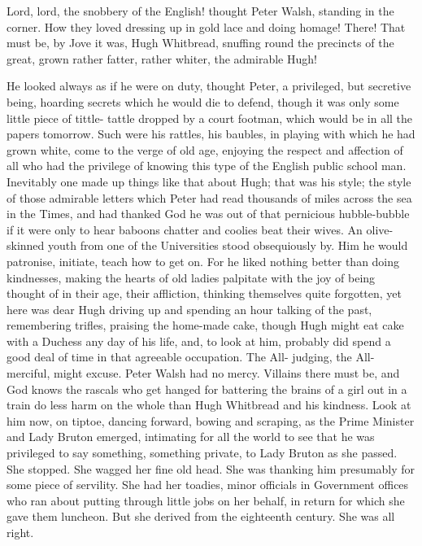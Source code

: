 \documentclass[lang=cn,10pt]{elegantbook}
\begin{document}
Lord, lord, the snobbery of the English! thought Peter Walsh,
standing in the corner.  How they loved dressing up in gold lace
and doing homage!  There!  That must be, by Jove it was, Hugh
Whitbread, snuffing round the precincts of the great, grown rather
fatter, rather whiter, the admirable Hugh!

He looked always as if he were on duty, thought Peter, a
privileged, but secretive being, hoarding secrets which he would
die to defend, though it was only some little piece of tittle-
tattle dropped by a court footman, which would be in all the papers
tomorrow.  Such were his rattles, his baubles, in playing with
which he had grown white, come to the verge of old age, enjoying
the respect and affection of all who had the privilege of knowing
this type of the English public school man.  Inevitably one made up
things like that about Hugh; that was his style; the style of those
admirable letters which Peter had read thousands of miles across
the sea in the Times, and had thanked God he was out of that
pernicious hubble-bubble if it were only to hear baboons chatter
and coolies beat their wives.  An olive-skinned youth from one of
the Universities stood obsequiously by.  Him he would patronise,
initiate, teach how to get on.  For he liked nothing better than
doing kindnesses, making the hearts of old ladies palpitate with
the joy of being thought of in their age, their affliction,
thinking themselves quite forgotten, yet here was dear Hugh driving
up and spending an hour talking of the past, remembering trifles,
praising the home-made cake, though Hugh might eat cake with a
Duchess any day of his life, and, to look at him, probably did
spend a good deal of time in that agreeable occupation.  The All-
judging, the All-merciful, might excuse.  Peter Walsh had no mercy.
Villains there must be, and God knows the rascals who get hanged
for battering the brains of a girl out in a train do less harm on
the whole than Hugh Whitbread and his kindness.  Look at him now,
on tiptoe, dancing forward, bowing and scraping, as the Prime
Minister and Lady Bruton emerged, intimating for all the world to
see that he was privileged to say something, something private, to
Lady Bruton as she passed.  She stopped.  She wagged her fine old
head.  She was thanking him presumably for some piece of servility.
She had her toadies, minor officials in Government offices who ran
about putting through little jobs on her behalf, in return for
which she gave them luncheon.  But she derived from the eighteenth
century.  She was all right.
\end{document}
